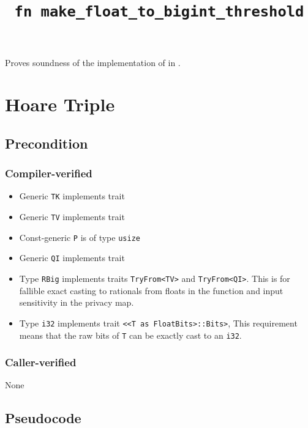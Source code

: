 \documentclass{article}
\title{\texttt{fn make\_float\_to\_bigint\_threshold}}
\author{\MichaelShoemateAuthor}
\date{}
\begin{document}
\maketitle

\contrib
Proves soundness of the implementation of  in .

\section{Hoare Triple}
\subsection*{Precondition}
\subsubsection*{Compiler-verified}

\begin{itemize}
    \item Generic \texttt{TK} implements trait 
    \item Generic \texttt{TV} implements trait 
    \item Const-generic \texttt{P} is of type \texttt{usize}
    \item Generic \texttt{QI} implements trait 
    \item Type \texttt{RBig} implements traits \texttt{TryFrom<TV>} and \texttt{TryFrom<QI>}.
        This is for fallible exact casting to rationals from floats in the function and input sensitivity in the privacy map.
    \item Type \texttt{i32} implements trait \texttt{<<T as FloatBits>::Bits>},
        This requirement means that the raw bits of \texttt{T} can be exactly cast to an \texttt{i32}.
\end{itemize}

\subsubsection*{Caller-verified}
None

\subsection*{Pseudocode}

\end{document}
